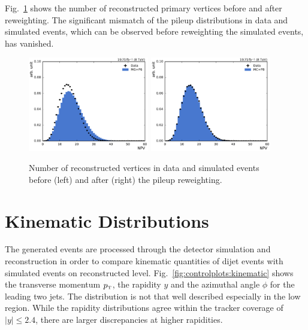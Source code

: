 Fig.~\ref{fig:mc:npv_reweighting} shows the number of reconstructed primary vertices
before and after reweighting. The significant mismatch of the
pileup distributions in data and simulated events, which can be observed before
reweighting the simulated events, has vanished.

\begin{figure}[htbp]
    \centering
    \includegraphics[width=0.47\textwidth]{figures/measurement/npv_beforereweighting.pdf}\hfill
    \includegraphics[width=0.47\textwidth]{figures/measurement/npv_afterreweighting.pdf}
    \caption[Number of reconstructed vertices]{Number of reconstructed vertices in data and simulated events before
    (left) and after (right) the pileup reweighting.}
    \label{fig:mc:npv_reweighting}
\end{figure}

\section{Kinematic Distributions}

The generated events are processed through the detector simulation and
reconstruction in order to compare kinematic quantities of dijet events with
simulated events on reconstructed level. Fig.~\ref{fig:controlplots:kinematic}
shows the transverse momentum $\pt$, the rapidity $y$ and the azimuthal angle
$\phi$ for the leading two jets. The \pt distribution is not that well described
especially in the low \pt region. While the rapidity distributions agree
within the tracker coverage of $|y| \leq 2.4$, there are larger
discrepancies at higher rapidities.

